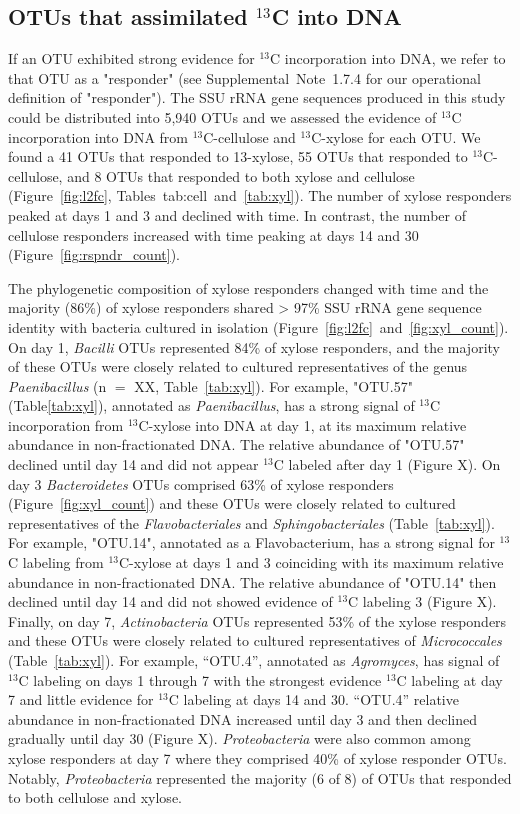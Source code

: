 \subsection{OTUs that assimilated $^{13}$C into DNA} \label{responders}
If an OTU exhibited strong evidence for $^{13}$C incorporation into DNA, we
refer to that OTU as a "responder" (see Supplemental Note 1.7.4 for our
operational definition of "responder"). The SSU rRNA gene sequences produced in
this study could be distributed into 5,940 OTUs and we assessed the evidence of
$^{13}$C incorporation into DNA from $^{13}$C-cellulose and $^{13}$C-xylose for
each OTU. We found a 41 OTUs that responded to 13-xylose, 55 OTUs that
responded to $^{13}$C-cellulose, and 8 OTUs that responded to both xylose and
cellulose (Figure~\ref{fig:l2fc}, Tables~{tab:cell}~and~\ref{tab:xyl}). The
number of xylose responders peaked at days 1 and 3 and declined with time. In
contrast, the number of cellulose responders increased with time peaking at
days 14 and 30 (Figure~\ref{fig:rspndr_count}). 

The phylogenetic composition of xylose responders changed with time and the
majority (86\%) of xylose responders shared > 97\% SSU rRNA gene sequence
identity with bacteria cultured in isolation
(Figure~\ref{fig:l2fc}~and~\ref{fig:xyl_count}). On day 1, \textit{Bacilli}
OTUs represented 84\% of xylose responders, and the majority of these OTUs were
closely related to cultured representatives of the genus \textit{Paenibacillus}
(n $=$ XX, Table~\ref{tab:xyl}). For example, "OTU.57" (Table\ref{tab:xyl}),
annotated as \textit{Paenibacillus}, has a strong signal of $^{13}$C
incorporation from $^{13}$C-xylose into DNA at day 1, at its maximum relative
abundance in non-fractionated DNA. The relative abundance of "OTU.57"
declined until day 14 and did not appear $^{13}$C labeled after day 1 (Figure
X). On day 3 \textit{Bacteroidetes} OTUs comprised 63\% of xylose responders
(Figure~\ref{fig:xyl_count}) and these OTUs were closely
related to cultured representatives of the \textit{Flavobacteriales} and
\textit{Sphingobacteriales} (Table~\ref{tab:xyl}). For example, "OTU.14",
annotated as a Flavobacterium, has a strong signal for $^{13}$C labeling from
$^{13}$C-xylose at days 1 and 3 coinciding with its maximum relative abundance
in non-fractionated DNA. The relative abundance of "OTU.14" then declined
until day 14 and did not showed evidence of $^{13}$C  labeling 
3 (Figure X). Finally, on day 7, \textit{Actinobacteria} OTUs represented 53\%
of the xylose responders and these OTUs were closely related to cultured
representatives of \textit{Micrococcales} (Table~\ref{tab:xyl}). For example,
``OTU.4'', annotated as \textit{Agromyces}, has signal of $^{13}$C labeling
on days 1 through 7 with the strongest evidence $^{13}$C labeling at day
7 and little evidence for $^{13}$C labeling at days 14 and 30. ``OTU.4''
relative abundance in non-fractionated DNA increased until day 3 and
then declined gradually until day 30 (Figure X). \textit{Proteobacteria} were
also common among xylose responders at day 7 where they comprised 40\% of
xylose responder OTUs. Notably, \textit{Proteobacteria} represented the
majority (6 of 8) of OTUs that responded to both cellulose and xylose. 


